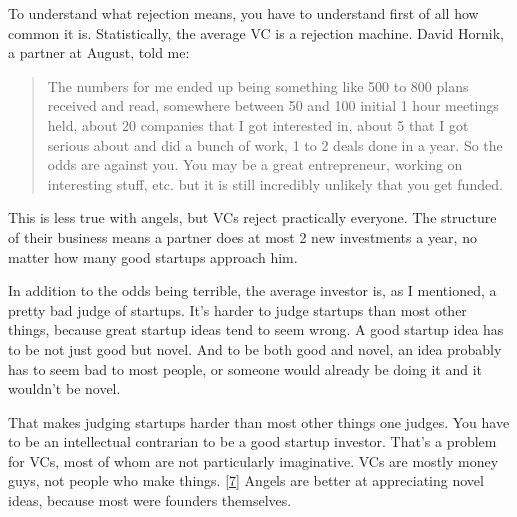 To
                    understand what rejection means, you have to understand
                    first of all how common it is. Statistically, the average VC
                    is a rejection machine. David Hornik, a partner at August,
                    told me:
                  


                  \begin{quote}

                    The numbers for me ended up being something like 500 to 800
                    plans received and read, somewhere between 50 and 100
                    initial 1 hour meetings held, about 20 companies that I got
                    interested in, about 5 that I got serious about and did a
                    bunch of work, 1 to 2 deals done in a year. So the odds are
                    against you. You may be a great entrepreneur, working on
                    interesting stuff, etc. but it is still incredibly unlikely
                    that you get funded.
                  
\end{quote}

                  This is less true with angels, but VCs reject practically
                  everyone. The structure of their business means a partner does
                  at most 2 new investments a year, no matter how many good
                  startups approach him.

In addition to the odds
                  being terrible, the average investor is, as I mentioned, a
                  pretty bad judge of startups. It's harder to judge startups
                  than most other things, because great startup ideas tend to
                  seem wrong. A good startup idea has to be not just good but
                  novel. And to be both good and novel, an idea probably has to
                  seem bad to most people, or someone would already be doing it
                  and it wouldn't be novel.

That makes judging
                  startups harder than most other things one judges. You have to
                  be an intellectual contrarian to be a good startup investor.
                  That's a problem for VCs, most of whom are not particularly
                  imaginative. VCs are mostly money guys, not people who make
                  things.
                  [\href{\#f7n}{7}]
                  Angels are better at appreciating novel ideas, because most
                  were founders themselves.

